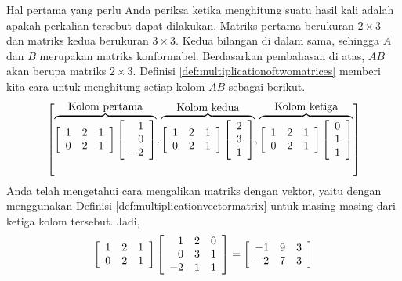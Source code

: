 \begin{solution} Hal pertama yang perlu Anda periksa ketika menghitung suatu
hasil kali adalah apakah perkalian tersebut dapat dilakukan. Matriks pertama
berukuran $2\times 3$ dan matriks kedua berukuran $3\times 3$. Kedua
bilangan di dalam sama, sehingga $A$ dan $B$ merupakan matriks konformabel.
Berdasarkan pembahasan di atas, $AB$ akan berupa matriks $2\times 3$.
Definisi \ref{def:multiplicationoftwomatrices} memberi kita cara untuk
menghitung setiap kolom $AB$ sebagai berikut.
\begin{equation*}
\left[ \overset{
\mbox{Kolom pertama}}{\overbrace{\left[
\begin{array}{rrr}
1 & 2 & 1 \\
0 & 2 & 1
\end{array}
\right] \left[
\begin{array}{r}
1 \\
0 \\
-2
\end{array}
\right] }},\overset{\mbox{Kolom kedua}}{\overbrace{\left[
\begin{array}{rrr}
1 & 2 & 1 \\
0 & 2 & 1
\end{array}
\right] \left[
\begin{array}{r}
2 \\
3 \\
1
\end{array}
\right] }},\overset{\mbox{Kolom ketiga}}{\overbrace{\left[
\begin{array}{rrr}
1 & 2 & 1 \\
0 & 2 & 1
\end{array}
\right] \left[
\begin{array}{r}
0 \\
1 \\
1
\end{array}
\right] }}\right]
\end{equation*}
Anda telah mengetahui cara mengalikan matriks dengan vektor, yaitu dengan menggunakan Definisi \ref{def:multiplicationvectormatrix} untuk
masing-masing dari ketiga kolom tersebut. Jadi,
\begin{equation*}
\left[
\begin{array}{rrr}
1 & 2 & 1 \\
0 & 2 & 1
\end{array}
\right] \left[
\begin{array}{rrr}
1 & 2 & 0 \\
0 & 3 & 1 \\
-2 & 1 & 1
\end{array}
\right] =\allowbreak \left[
\begin{array}{rrr}
-1 & 9 & 3 \\
-2 & 7 & 3
\end{array}
\right] 
\end{equation*}
\end{solution}

